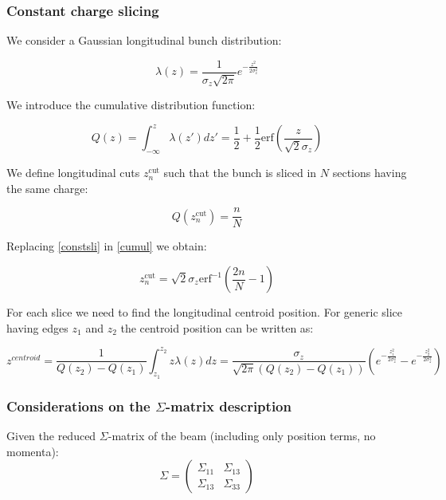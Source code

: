 \subsubsection{Constant charge slicing}
\label{app:slicing}
We consider a Gaussian longitudinal bunch distribution:

\begin{equation}
\lambda(z) = \frac{1}{\sigma_z \sqrt{2\pi}}e^{-\frac{z^2}{2\sigma_z^2}} 
\end{equation}

We introduce the cumulative distribution function:

\begin{equation}
Q(z) = \int_{-\infty}^{z} \lambda(z')dz' = \frac{1}{2}+\frac{1}{2}\mathrm{erf}\left(\frac{z}{\sqrt{2}\sigma_z}\right)
\label{cumul}
\end{equation}

We define longitudinal cuts $z^{\mathrm{cut}}_n$ such that the bunch is sliced in $N$ sections having the same charge:

\begin{equation}
Q(z^{\mathrm{cut}}_n) = \frac{n}{N}
\label{constsli}
\end{equation}

Replacing \ref{constsli} in \ref{cumul} we obtain:

\begin{equation}
z^{\mathrm{cut}}_n = \sqrt{2} \sigma_z \mathrm{erf}^{-1}\left( \frac{2n}{N}-1\right)
\end{equation}

For each slice we need to find the longitudinal centroid position. For generic slice having edges $z_1$ and $z_2$ the centroid position can be written as:

\begin{equation}
z^{centroid}= \frac{1}{Q(z_2) - Q(z_1)}\int_{z_1}^{z_2} z \lambda(z)dz = \frac{\sigma_z}{\sqrt{2\pi}\left(Q(z_2) - Q(z_1)\right)}\left(e^{-\frac{z_1^2}{2\sigma_z^2}}-e^{-\frac{z_2^2}{2\sigma_z^2}}\right)
\end{equation}

\subsubsection{Considerations on the $\Sigma$-matrix description}
\label{app:sigma}

Given the reduced $\Sigma$-matrix of the beam (including only position terms, no momenta):
\begin{equation}
\Sigma = \left(
\begin{matrix}
{\Sigma}_{11} & {\Sigma}_{13}\\
{\Sigma}_{13} & {\Sigma}_{33}
\end{matrix}
\right)
\end{equation}



